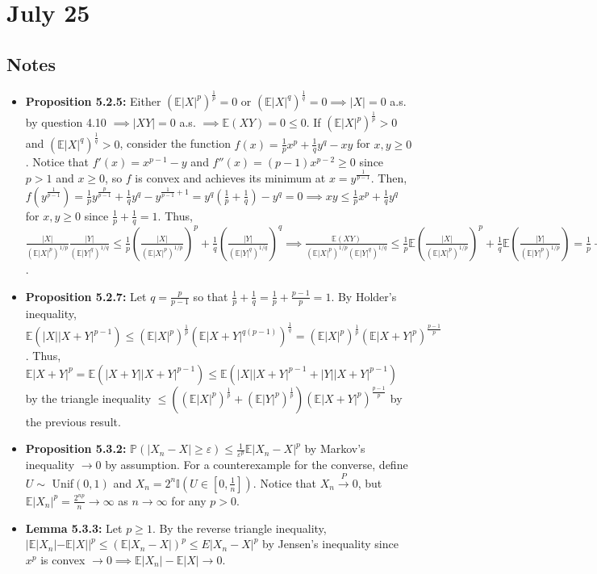 \documentclass[12pt]{article}
\newcommand{\E}{\mathbb{E}}
\newcommand{\I}{\mathbb{I}}
\newcommand{\p}{\mathbb{P}}
\begin{document}
\section*{July 25}

\subsection*{Notes}
\begin{itemize}
    \item \textbf{Proposition 5.2.5:} Either $(\E|X|^p)^{\frac{1}{p}} = 0$ or $(\E|X|^q)^{\frac{1}{q}} = 0 \implies |X| = 0$ a.s. by question 4.10 $\implies |XY| = 0$ a.s. $\implies \E(XY) = 0 \leq 0$. If $(\E|X|^p)^{\frac{1}{p}} > 0$ and $(\E|X|^q)^{\frac{1}{q}} > 0$, consider the function $f(x) = \frac{1}{p}x^p + \frac{1}{q}y^q - xy$ for $x, y \geq 0$. Notice that $f'(x) = x^{p-1} - y$ and $f''(x) = (p-1)x^{p-2} \geq 0$ since $p > 1$ and $x \geq 0$, so $f$ is convex and achieves its minimum at $x = y^{\frac{1}{p-1}}$. Then, $f(y^{\frac{1}{p-1}}) = \frac{1}{p}y^{\frac{p}{p-1}} + \frac{1}{q}y^q - y^{\frac{1}{p-1}+1} = y^q(\frac{1}{p} + \frac{1}{q}) - y^q = 0 \implies xy \leq \frac{1}{p}x^p + \frac{1}{q}y^q$ for $x, y \geq 0$ since $\frac{1}{p} + \frac{1}{q} = 1$. Thus, $\frac{|X|}{(\E|X|^p)^{1/p}} \frac{|Y|}{(\E|Y|^q)^{1/q}} \leq \frac{1}{p}(\frac{|X|}{(\E|X|^p)^{1/p}})^p + \frac{1}{q}(\frac{|Y|}{(\E|Y|^q)^{1/q}})^q \implies \frac{\E(XY)}{(\E|X|^p)^{1/p}(\E|Y|^q)^{1/q}} \leq \frac{1}{p}\E(\frac{|X|}{(\E|X|^p)^{1/p}})^p + \frac{1}{q}\E(\frac{|Y|}{(\E|Y|^p)^{1/p}}) = \frac{1}{p} + \frac{1}{q} = 1$.
    \item \textbf{Proposition 5.2.7:} Let $q = \frac{p}{p-1}$ so that $\frac{1}{p} + \frac{1}{q} = \frac{1}{p} + \frac{p-1}{p} = 1$. By Holder's inequality, $\E(|X||X+Y|^{p-1}) \leq (\E|X|^p)^{\frac{1}{p}}(\E|X+Y|^{q(p-1)})^{\frac{1}{q}} = (\E|X|^p)^{\frac{1}{p}}(\E|X+Y|^p)^{\frac{p-1}{p}}$. Thus, $\E|X+Y|^p = \E(|X+Y||X+Y|^{p-1}) \leq \E(|X||X+Y|^{p-1} + |Y||X+Y|^{p-1})$ by the triangle inequality $\leq ((\E|X|^p)^{\frac{1}{p}} + (\E|Y|^p)^{\frac{1}{p}})(\E|X+Y|^p)^{\frac{p-1}{p}}$ by the previous result.
    \item \textbf{Proposition 5.3.2:} $\p(|X_n - X| \geq \varepsilon) \leq \frac{1}{\varepsilon^p}\E|X_n - X|^p$ by Markov's inequality $\to 0$ by assumption. For a counterexample for the converse, define $U \sim$ Unif$(0, 1)$ and $X_n = 2^n\I(U \in [0,\frac{1}{n}])$. Notice that $X_n \overset{P}{\to} 0$, but $\E|X_n|^p = \frac{2^{np}}{n} \to \infty$ as $n \to \infty$ for any $p > 0$.
    \item \textbf{Lemma 5.3.3:} Let $p \geq 1$. By the reverse triangle inequality, $|\E|X_n| - \E|X||^p \leq (\E|X_n - X|)^p \leq E|X_n - X|^p$ by Jensen's inequality since $x^p$ is convex $\to 0 \implies \E|X_n| - \E|X| \to 0$.

\end{itemize}
\end{document}
